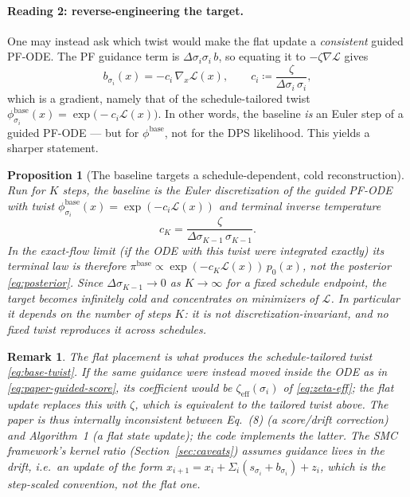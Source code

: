 \documentclass[11pt]{article}
\newtheorem{proposition}{Proposition}
\newtheorem{remark}{Remark}
\begin{document}
\paragraph{Reading 2: reverse-engineering the target.}
One may instead ask which twist would make the flat update a \emph{consistent} guided PF-ODE. The PF
guidance term is $\Delta\sigma_i\sigma_i\,b$, so equating it to $-\zeta\nabla\mathcal L$ gives
\begin{equation}\label{eq:base-twist}
  b_{\sigma_i}(x) = -c_i\,\nabla_x\mathcal L(x),
  \qquad
  c_i\coloneqq\frac{\zeta}{\Delta\sigma_i\,\sigma_i},
\end{equation}
which is a gradient, namely that of the schedule-tailored twist
$\phi^{\mathrm{base}}_{\sigma_i}(x)=\exp\!\bigl(-c_i\mathcal L(x)\bigr)$. In other words, the
baseline \emph{is} an Euler step of a guided PF-ODE --- but for $\phi^{\mathrm{base}}$, not for the
DPS likelihood. This yields a sharper statement.

\begin{proposition}[The baseline targets a schedule-dependent, cold reconstruction]\label{prop:no-twist}
Run for $K$ steps, the baseline is the Euler discretization of the guided PF-ODE with twist
$\phi^{\mathrm{base}}_{\sigma_i}(x)=\exp(-c_i\mathcal L(x))$ and terminal inverse temperature
\begin{equation}
  c_K = \frac{\zeta}{\Delta\sigma_{K-1}\,\sigma_{K-1}} .
\end{equation}
In the exact-flow limit (if the ODE with this twist were integrated exactly) its terminal law is
therefore $\pi^{\mathrm{base}}\propto\exp(-c_K\mathcal L(x))\,p_0(x)$, not the posterior
\eqref{eq:posterior}. Since $\Delta\sigma_{K-1}\to0$ as $K\to\infty$ for a fixed schedule endpoint,
the target becomes infinitely cold and concentrates on minimizers of $\mathcal L$. In particular it
depends on the number of steps $K$: it is not discretization-invariant, and no fixed twist reproduces
it across schedules.
\end{proposition}

\begin{remark}
The flat placement is what produces the schedule-tailored twist \eqref{eq:base-twist}. If the same
guidance were instead moved inside the ODE as in \eqref{eq:paper-guided-score}, its coefficient
would be $\zeta_{\mathrm{eff}}(\sigma_i)$ of \eqref{eq:zeta-eff}; the flat update replaces this with
$\zeta$, which is equivalent to the tailored twist above. The paper is thus internally inconsistent
between Eq.~(8) (a score/drift correction) and Algorithm~1 (a flat state update); the code implements
the latter. The SMC framework's kernel ratio (Section~\ref{sec:caveats}) assumes guidance lives in
the drift, i.e.\ an update of the form
$x_{i+1}=x_i+\Sigma_i(s_{\sigma_i}+b_{\sigma_i})+z_i$, which is the step-scaled convention, not the
flat one.
\end{remark}
\end{document}
